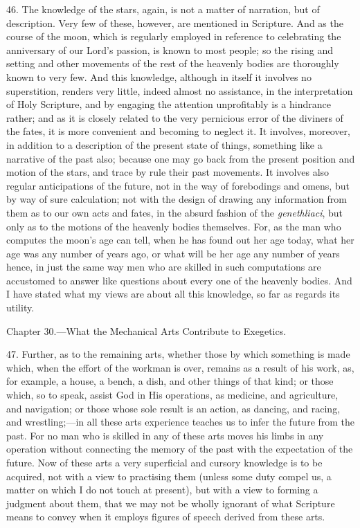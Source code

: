 46. The knowledge of the stars, again, is not a matter of narration, but of description. Very few of these, however, are mentioned in Scripture. And as the course of the moon, which is regularly employed in reference to celebrating the anniversary of our Lord’s passion, is known to most people; so the rising and setting and other movements of the rest of the heavenly bodies are thoroughly known to very few. And this knowledge, although in itself it involves no superstition, renders very little, indeed almost no assistance, in the interpretation of Holy Scripture, and by engaging the attention unprofitably is a hindrance rather; and as it is closely related to the very pernicious error of the diviners of the fates, it is more convenient and becoming to neglect it. It involves, moreover, in addition to a description of the present state of things, something like a narrative of the past also; because one may go back from the present position and motion of the stars, and trace by rule their past movements. It involves also regular anticipations of the future, not in the way of forebodings and omens, but by way of sure calculation; not with the design of drawing any information from them as to our own acts and fates, in the absurd fashion of the \emph{ genethliaci}, but only as to the motions of the heavenly bodies themselves. For, as the man who computes the moon’s age can tell, when he has found out her age today, what her age was any number of years ago, or what will be her age any number of years hence, in just the same way men who are skilled in such computations are accustomed to answer like questions about every one of the heavenly bodies. And I have stated what my views are about all this knowledge, so far as regards its utility.


Chapter 30.—What the Mechanical Arts Contribute to Exegetics.

47. Further, as to the remaining arts, whether those by which something is made which, when the effort of the workman is over, remains as a result of his work, as, for example, a house, a bench, a dish, and other things of that kind; or those which, so to speak, assist God in His operations, as medicine, and agriculture, and navigation; or those whose sole result is an action, as dancing, and racing, and wrestling;—in all these arts experience teaches us to infer the future from the past. For no man who is skilled in any of these arts moves his limbs in any operation without connecting the memory of the past with the expectation of the future. Now of these arts a very superficial and cursory knowledge is to be acquired, not with a view to practising them (unless some duty compel us, a matter on which I do not touch at present), but with a view to forming a judgment about them, that we may not be wholly ignorant of what Scripture means to convey when it employs figures of speech derived from these arts.


